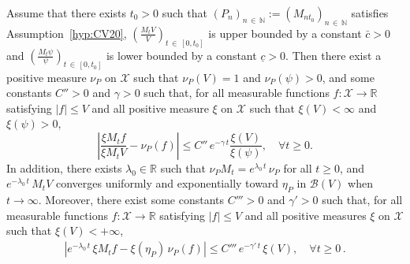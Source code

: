 \documentclass[AHL,Unicode,longabstracts,published]{cedram}
\newcommand{\RR}{\mathbb{R}}
\newcommand{\NN}{\mathbb{N}}
\newcommand{\clX}{\mathcal{X}}
\newcommand{\clB}{\mathcal{B}}
\newcommand{\1}{\mathbf{1}}
\let\oldforall\forall
\renewcommand*{\forall}{\mathrel{\oldforall}}
\begin{document}
\begin{theo}[{\cite[Corollary~2.4]{CV20}}]\label{th:CV20}
Assume that there exists $t_0>0$ such that $(P_{n})_{n\,\in\,\NN}:=(M_{nt_0})_{n\,\in\,\NN}$ satisfies Assumption~\ref{hyp:CV20}, $(\frac{M_tV}{V})_{t\,\in\,[0,t_0]}$ is upper bounded by a constant $\bar c>0$ and $(\frac{M_t\psi}{\psi})_{t\,\in\,[0,t_0]}$ is lower bounded by a constant $\underline{c}>0$. Then there exist a positive measure $\nu_P$ on $\clX$ such that $\nu_P(V)=1$ and $\nu_P(\psi)>0$, and some constants $C''>0$ and $\gamma>0$ such that, for all measurable functions $f:\clX\to \RR$ satisfying $|f|\leq V$ and all positive measure $\xi$ on $\clX$ such that $\xi(V)<\infty$ and $\xi(\psi)>0$,
\[
\left| \frac{\xi M_t f}{\xi M_t V} -\nu_P(f)\right| \leq C''\,e^{-\gamma\,t} \frac{\xi(V)}{\xi(\psi)}, \quad \forall t\geq 0.
\]
In addition, there exists $\lambda_0\in \RR$ such that $\nu_P M_t = e^{\lambda_0\,t}\,\nu_P$ for all $t\geq 0$, and $e^{-\lambda_0\,t}\,M_t V$ converges uniformly and exponentially toward $\eta_P$ in $\clB(V)$ when $t\to \infty$. Moreover, there exist some constants $C'''>0$ and $\gamma'>0$ such that, for all measurable functions $f:\clX\to \RR$ satisfying $|f|\leq V$ and all positive measures $\xi$ on $\clX$ such that $\xi(V)<+\infty$,
\begin{align}\label{eq:cor2.4.CV20.eta}
\left| e^{-\lambda_0\,t}\,\xi M_t f-\xi(\eta_P)\,\nu_P(f) \right| \leq C'''\, e^{-\gamma'\,t}\, \xi(V), \quad \forall t\geq 0\,.
\end{align}
\end{theo}





\end{document}
